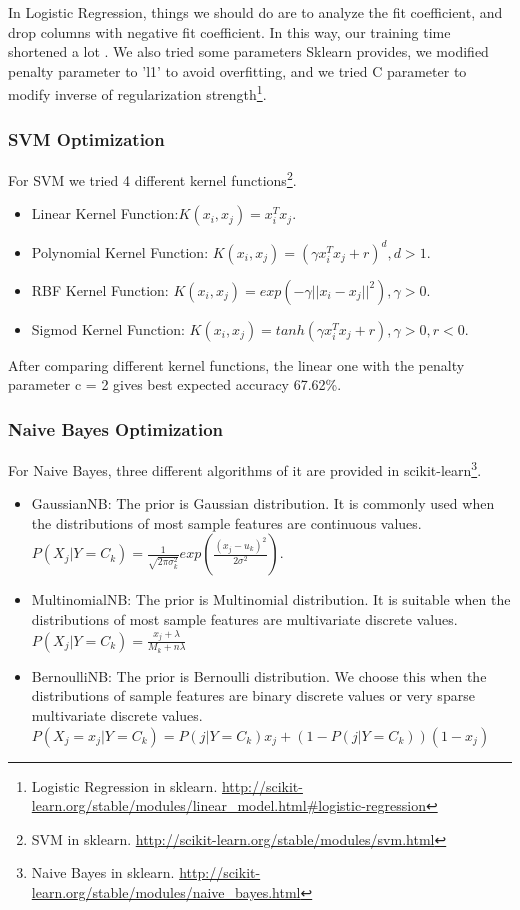 \documentclass[letterpaper]{article} %
\begin{document}
In Logistic Regression, things we should do are to analyze the fit coefficient, and drop columns with negative fit coefficient. In this way, our training time shortened a lot \cite{brownlee2016logistic}. We also tried some parameters Sklearn provides, we modified penalty parameter to 'l1' to avoid overfitting, and we tried C parameter to modify inverse of regularization strength\footnote{Logistic Regression in sklearn. \url{http://scikit-learn.org/stable/modules/linear_model.html#logistic-regression}}.

\subsubsection{SVM Optimization}

For SVM we tried 4 different kernel functions\footnote{SVM in sklearn. \url{http://scikit-learn.org/stable/modules/svm.html}}.
\begin{itemize}
\item Linear Kernel Function:$K(x_i,x_j)=x_i^Tx_j$.
\item Polynomial Kernel Function: $K(x_i,x_j)=(\gamma x_i^T x_j+r)^d,d>1$.
\item RBF Kernel Function: $K(x_i,x_j)=exp(-\gamma||x_i-x_j||^2),\gamma>0$.
\item Sigmod Kernel Function: $K(x_i,x_j)=tanh(\gamma x_i^T x_j+r), \gamma>0,r<0$.
\end{itemize}

After comparing different kernel functions, the linear one with the penalty parameter c = 2 gives best expected accuracy 67.62\%.

\subsubsection{Naive Bayes Optimization}

For Naive Bayes, three different algorithms of it are provided in scikit-learn\footnote{Naive Bayes in sklearn. \url{http://scikit-learn.org/stable/modules/naive_bayes.html}}.

\begin{itemize}
\item GaussianNB: The prior is Gaussian distribution. It is commonly used when the distributions of most sample features are continuous values.$P(X_j|Y=C_k) = \frac{1}{\sqrt{2 \pi \sigma_k^2}}exp(\frac{(x_j-u_k)^2}{2\sigma^2})$.
\item MultinomialNB: The prior is Multinomial distribution. It is suitable when the distributions of most sample features are multivariate discrete values.$P(X_j|Y=C_k)=\frac{x_j+\lambda}{M_k+n\lambda}$
\item BernoulliNB: The prior is Bernoulli distribution. We choose this when the distributions of sample features are binary discrete values or very sparse multivariate discrete values.$P(X_j=x_j|Y=C_k)=P(j|Y=C_k)x_j+(1-P(j|Y=C_k))(1-x_j)$
\end{itemize}
\end{document}
